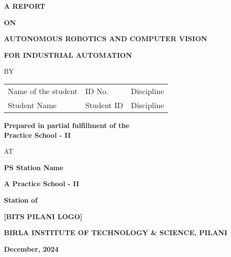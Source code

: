 \documentclass{book}
\begin{document}


\large

\thispagestyle{empty}
\centerline{\bf A REPORT}
\vspace*{0.3cm}
\centerline{\bf ON}
\vspace*{0.3cm}
\centerline{\bf AUTONOMOUS ROBOTICS AND COMPUTER VISION}
\centerline{\bf FOR INDUSTRIAL AUTOMATION}
\vspace*{2cm}

\centerline{BY}
\vspace*{1cm}

\begin{center}
	\begin{tabular}{lll}
		Name of the student & \hspace*{2cm} ID No. & \hspace*{2cm} Discipline \\ 
		Student Name &\hspace*{2cm} Student ID &\hspace*{2cm} Discipline \\
	\end{tabular}
\end{center}

\vspace*{2cm}
\begin{center}
	{\bf Prepared in partial fulfillment of the \\
	Practice School - II}
\end{center}

\vspace*{0.5cm}

\centerline{AT}

\vspace*{1cm}
        \centerline{\bf PS Station Name}
	\vspace{0.2cm}
	\centerline{\bf A Practice School - II}
	\vspace{0.2cm}
	\centerline{\bf Station of}
	\vspace{0.5cm}
\vspace{1cm}
\centerline{\bf [BITS PILANI LOGO]}
\vspace{1cm}

	\centerline{\bf BIRLA INSTITUTE OF TECHNOLOGY \& SCIENCE, PILANI}
	\vspace*{0.5cm}
	\centerline{\bf December, 2024}
	\newpage

\thispagestyle{empty}
\end{document}
